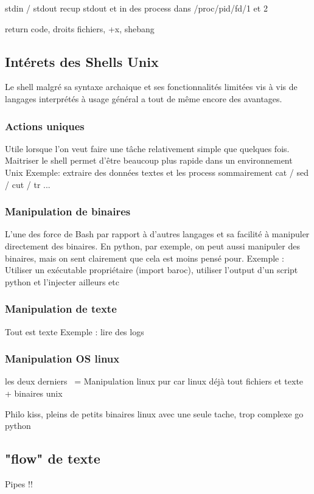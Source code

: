 \documentclass[11pt,a4paper]{article}
\begin{document}
stdin / stdout
recup stdout et in des process dans /proc/pid/fd/1 et 2

return code, 
droits fichiers, +x, shebang

\subsection{Intérets des Shells Unix}
Le shell malgré sa syntaxe archaique et ses fonctionnalités limitées vis à vis de langages interprétés à usage général a tout de même encore des avantages.

\subsubsection{Actions uniques}
Utile lorsque l'on veut faire une tâche relativement simple que quelques fois. 
Maitriser le shell permet d'être beaucoup plus rapide dans un environnement Unix
Exemple: extraire des données textes et les process sommairement
cat / sed / cut / tr ...

\subsubsection{Manipulation de binaires}
L'une des force de Bash par rapport à d'autres langages et sa facilité à manipuler directement des binaires. En python, par exemple, on peut aussi manipuler des binaires, mais on sent clairement que cela est moins pensé pour.
Exemple : Utiliser un exécutable propriétaire (import baroc), utiliser l'output d'un script python et l'injecter ailleurs etc


\subsubsection{Manipulation de texte}
Tout est texte
Exemple : lire des logs

\subsubsection{Manipulation OS linux}
les deux derniers ~= Manipulation linux pur car linux déjà tout fichiers et texte + binaires unix


Philo kiss, pleins de petits binaires linux avec une seule tache, trop complexe go python

\subsection{"flow" de texte}
Pipes !!
\end{document}
